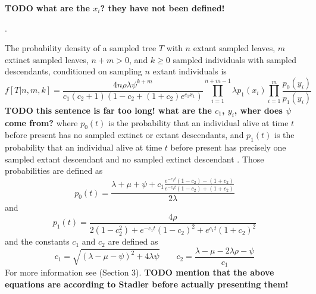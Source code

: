\documentclass{llncs}
\begin{document}
{\bf TODO what are the $x_i$? they have not been defined!} 

\citep[pg.~11][]{Stadler2010}.

The probability density of a sampled tree $T$ with $n$ extant sampled leaves,
$m$ extinct sampled leaves, $n+m > 0$, and $k \geq 0$ sampled individuals with
sampled descendants, conditioned on sampling $n$ extant individuals is
%
%
$$f[T|n,m,k] = \frac{4n\rho\lambda\psi^{k+m}}{c_1(c_2+1)(1-c_2+(1+c_2)e^{c_1x_1})}\prod_{i=1}^{n+m-1}\lambda p_1(x_i)\prod_{i=1}^{m}\frac{p_0(y_i)}{p_1(y_i)}$$
%
%
{\bf TODO this sentence is far too long! what are the $c_1$, $y_i$, wher does $\psi$ come from?} where $p_0(t)$ is the probability that an individual alive at time $t$ before
present has no sampled extinct or extant descendants, and $p_1(t)$ is the
probability that an individual alive at time $t$ before present has precisely
one sampled extant descendant and no sampled extinct descendant \citep[Eqn (9)][]{Stadler2010}. Those probabilities
are defined as
%
$$p_0(t) = \frac{\lambda+\mu+\psi+c_1\frac{e^{-c_1 t}(1-c_2)-(1+c_2)}{e^{-c_1t}(1-c_2)+(1+c_2)}}{2\lambda}$$
and
$$p_1(t) = \frac{4\rho}{2(1-c_2^2)+e^{-c_1t}(1-c_2)^2+e^{c_1t}(1+c_2)^2}$$
%
and the constants $c_1$ and $c_2$ are defined as
%
$$c_1 = \sqrt{(\lambda-\mu-\psi)^2 + 4\lambda\psi} \qquad c_2 = \frac{\lambda-\mu-2\lambda\rho-\psi}{c_1}$$
%
For more information see \cite{Stadler2010} (Section 3).
{\bf TODO mention that the above equations are according to Stadler before actually presenting them!} 
\end{document}
